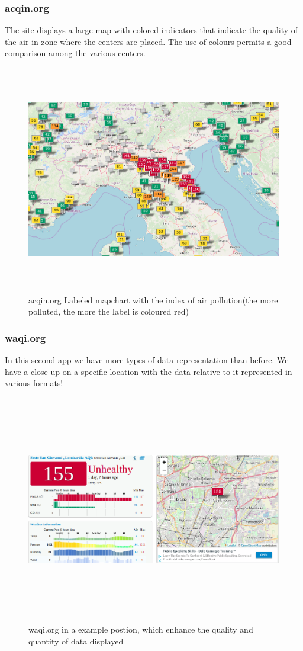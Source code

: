 \documentclass[12pt]{article} %
\begin{document}
\begin{itemize}
\subsubsection{acqin.org}
The site displays a large map with colored indicators that indicate the quality of the air in zone where the centers are placed. The use of colours permits a good comparison among the various centers.
\begin{figure}[H]
  \centering
  \includegraphics[width=25cm,height=10cm,keepaspectratio]{img/aqicn.png}
  \caption{acqin.org Labeled mapchart with the index of air pollution(the more polluted, the more the label is coloured red)}
  \label{fig:boat3}
\end{figure}
\subsubsection{waqi.org}
In this second app we have more types of data representation than before. We have a close-up on a specific location with the data relative to it represented in various formats!
\begin{figure}[H]
  \centering
  \includegraphics[width=15cm,height=10cm,keepaspectratio]{img/TechnicalExample.png}
  \caption{waqi.org in a example postion, which enhance the quality and quantity of data displayed}
  \label{fig:boat3}
\end{figure}

\end{itemize} 
\end{document}
